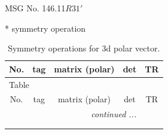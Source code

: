 \documentclass[fleqn,8pt]{jsarticle}
\begin{document}
\setcounter{MaxMatrixCols}{32}

\renewcommand{\tablename}{Table~}
\renewcommand{\figurename}{Figure~}
\begin{center}
\LARGE
MSG No. 146.11\quad$R31'$
\end{center}
* symmetry operation
\renewcommand{\arraystretch}{1.3}
\begin{longtable}{ccccc}
\caption{Symmetry operations for 3d polar vector.}
 \\
 \hline \hline
No. & tag & matrix (polar) & det & TR \\ \hline \endfirsthead

\multicolumn{4}{l}{\tablename\ \thetable{}} \\
 \hline \hline
No. & tag & matrix (polar) & det & TR \\ \hline \endhead

 \hline \hline
\multicolumn{4}{r}{\footnotesize\it continued ...} \\ \endfoot

 \hline \hline
\multicolumn{4}{r}{} \\ \endlastfoot


\end{longtable}
\end{document}
